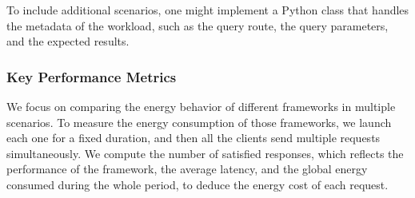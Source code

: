 \begin{table}[bth]
    \raggedright
    \caption{Stress levels for each scenario.}
    \label{frameworks:stress-levels}
\end{table}

To include additional scenarios, one might implement a Python class that handles the metadata of the workload, such as the query route, the query parameters, and the expected results.

\subsubsection{Key Performance Metrics}
We focus on comparing the energy behavior of different frameworks in multiple scenarios.
To measure the energy consumption of those frameworks, we launch each one for a fixed duration, and then all the clients send multiple requests simultaneously.
We compute the number of satisfied responses, which reflects the performance of the framework, the average latency, and the global energy consumed during the whole period, to deduce the energy cost of each request.

